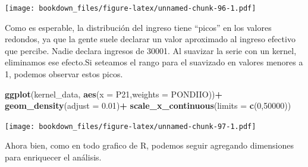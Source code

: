 \documentclass[]{book}
\newenvironment{Shaded}{\begin{snugshade}}{\end{snugshade}}
\newcommand{\DataTypeTok}[1]{\textcolor[rgb]{0.13,0.29,0.53}{#1}}
\newcommand{\DecValTok}[1]{\textcolor[rgb]{0.00,0.00,0.81}{#1}}
\newcommand{\FloatTok}[1]{\textcolor[rgb]{0.00,0.00,0.81}{#1}}
\newcommand{\KeywordTok}[1]{\textcolor[rgb]{0.13,0.29,0.53}{\textbf{#1}}}
\newcommand{\NormalTok}[1]{#1}
\newcommand{\OperatorTok}[1]{\textcolor[rgb]{0.81,0.36,0.00}{\textbf{#1}}}
\newcommand{\StringTok}[1]{\textcolor[rgb]{0.31,0.60,0.02}{#1}}
\begin{document}
\texttt{[image: bookdown\_files/figure-latex/unnamed-chunk-96-1.pdf]}

Como es esperable, la distribución del ingreso tiene ``picos'' en los valores redondos, ya que la gente suele declarar un valor aproximado al ingreso efectivo que percibe. Nadie declara ingresos de 30001. Al suavizar la serie con un kernel, eliminamos ese efecto.Si seteamos el rango para el suavizado en valores menores a 1, podemos observar estos picos.

\begin{Shaded}
\begin{Highlighting}[]
\KeywordTok{ggplot}\NormalTok{(kernel_data, }\KeywordTok{aes}\NormalTok{(}\DataTypeTok{x =}\NormalTok{ P21,}\DataTypeTok{weights =}\NormalTok{ PONDIIO))}\OperatorTok{+}\StringTok{ }
\KeywordTok{geom_density}\NormalTok{(}\DataTypeTok{adjust =} \FloatTok{0.01}\NormalTok{)}\OperatorTok{+}
\KeywordTok{scale_x_continuous}\NormalTok{(}\DataTypeTok{limits =} \KeywordTok{c}\NormalTok{(}\DecValTok{0}\NormalTok{,}\DecValTok{50000}\NormalTok{))}
\end{Highlighting}
\end{Shaded}

\texttt{[image: bookdown\_files/figure-latex/unnamed-chunk-97-1.pdf]}

Ahora bien, como en todo grafico de R, podemos seguir agregando dimensiones para enriquecer el análisis.
\end{document}

